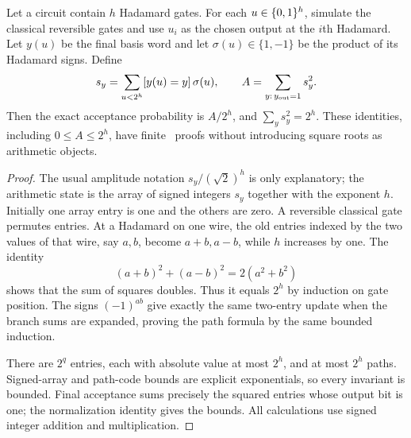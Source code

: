\begin{theorem}\label{thm:Q01}
Let a circuit contain $h$ Hadamard gates. For each $u\in\{0,1\}^h$, simulate the classical reversible gates and use $u_i$ as the chosen output at the $i$th Hadamard. Let $y(u)$ be the final basis word and let $\sigma(u)\in\{1,-1\}$ be the product of its Hadamard signs. Define
\[
 s_y=\sum_{u<2^h}[y(u)=y]\,\sigma(u),\qquad
 A=\sum_{y:\,y_{\rm out}=1}s_y^2.
\]
Then the exact acceptance probability is $A/2^h$, and $\sum_y s_y^2=2^h$. These identities, including $0\le A\le2^h$, have finite \ipra\ proofs without introducing square roots as arithmetic objects.
\end{theorem}
\begin{proof}
The usual amplitude notation $s_y/(\sqrt2)^h$ is only explanatory; the arithmetic state is the array of signed integers $s_y$ together with the exponent $h$. Initially one array entry is one and the others are zero. A reversible classical gate permutes entries. At a Hadamard on one wire, the old entries indexed by the two values of that wire, say $a,b$, become $a+b,a-b$, while $h$ increases by one. The identity
\[
 (a+b)^2+(a-b)^2=2(a^2+b^2)
\]
shows that the sum of squares doubles. Thus it equals $2^h$ by induction on gate position. The signs $(-1)^{ab}$ give exactly the same two-entry update when the branch sums are expanded, proving the path formula by the same bounded induction.

There are $2^q$ entries, each with absolute value at most $2^h$, and at most $2^h$ paths. Signed-array and path-code bounds are explicit exponentials, so every invariant is bounded. Final acceptance sums precisely the squared entries whose output bit is one; the normalization identity gives the bounds. All calculations use signed integer addition and multiplication.
\end{proof}

